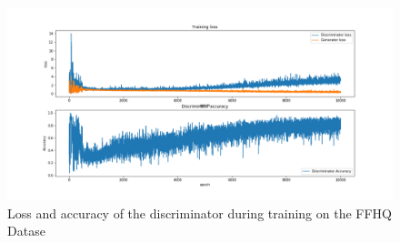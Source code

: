 \begin{figure}

\includegraphics[width=\textwidth]{fig/dcgan/ffhq/loss}
  \caption{Loss and accuracy of the discriminator during training on the FFHQ Datase}
  \label{dcgan-ffhq-loss}
\end{figure}

